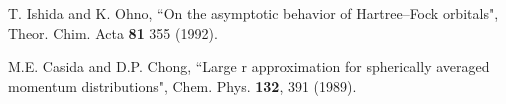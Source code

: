 \begin{thebibliography}{9}
T. Ishida and K. Ohno, 
``On the asymptotic behavior of Hartree--Fock orbitals", 
Theor. Chim. Acta {\bf 81} 355 (1992).

M.E. Casida and D.P. Chong, 
``Large r approximation for spherically averaged momentum distributions",
Chem. Phys. {\bf 132}, 391 (1989).

\begin{comment}


\bibitem{Cinal:10}
M. Cinal, 
``Direct mapping between exchange potentials of Hartree--Fock and 
Kohn--Sham schemes as origin of orbital proximity'', 
Jour. Chem. Phys. {\bf 132}, 014101 (2010).

\bibitem{Becke:88}
A.D. Becke, 
``Density--functional exchange--energy approximation with correct 
asymptotic behavior", 
Phys. Rev. A {\bf 38}, 3098 (1988).

\bibitem{Weber:71}
T.A. Weber and R.G. Parr, 
``Hartree--Fock theory with exchange cutoff'', 
Phys. Rev. A {\bf 3}, 81 (1971).
 
\bibitem{Weber:70}
T.A. Weber, N.C. Handy, and R.G. Parr, 
``SelfConsistenfField atomic wavefunctions from efficient nested 
basis sets", 
J. of Chem. Phys. {\bf 52}, 1501 (1970).

\bibitem{Amusia:04}
M.Ya. Amusia, A.Z. Msezane, V.R. Shaginyan, and D. Sokolovski, 
``On the relation between the Hartree--Fock and Kohn--Sham
approaches'',
Phys. Lett. A {\bf 330}, 10 (2015).


\bibitem{HohenberKohn:64}
P. Hohenberg, W. Kohn, 
Phys. Rev., \textbf{136}, B864 (1964).

\bibitem{KohnSham:65}
W. Kohn, L. J. Sham, 
Phys. Rev. \textbf{140}, A1133 (1965).


\bibitem{Becke:14} 
A. D. Becke,
J. Chem. Phys. \textbf{140}, 18A301 (2014).

\bibitem{Bartlett:10} 
R. J. Bartlett, 
Mol. Phys. \textbf{108}, 3299-3311 (2010).

\bibitem{Verma:12} 
P. Verma, R. J. Bartlett,
J. Chem. Phys. \textbf{137}, 134102 (2012).

\bibitem{Slater:51}
J. C. Slater, 
Phys. Rev. \textbf{81}, 385 (1951).

\bibitem{Krieger:92}
J. B. Krieger, Y. Li, G. J. Iafrate, 
Phys. Rev. A \textbf{45}, 101-126 (1992).


\end{comment}
\end{thebibliography}
